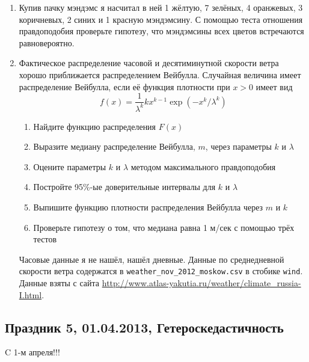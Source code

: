 \documentclass[12pt, a4paper]{article}\usepackage[]{graphicx}\usepackage[]{color}
\begin{document}
\begin{enumerate}
\item Купив пачку мэндэмс я насчитал в ней 1 жёлтую, 7 зелёных, 4 оранжевых, 3 коричневых, 2 синих и 1 красную мэндэмсину. С помощью теста отношения правдоподобия проверьте гипотезу, что мэндэмсины всех цветов встречаются равновероятно.
\item \useR Фактическое распределение часовой и десятиминутной скорости ветра хорошо приближается распределением Вейбулла. Случайная величина имеет распределение Вейбулла, если её функция плотности при $x>0$ имеет вид
\[
f(x)=\frac{1}{\lambda^k}kx^{k-1}\exp(-x^k/\lambda^k)
\]
\begin{enumerate}
\item Найдите функцию распределения $F(x)$
\item Выразите медиану распределение Вейбулла, $m$, через параметры $k$ и $\lambda$
\item Оцените параметры $k$ и $\lambda$ методом максимального правдоподобия
\item Постройте 95\%-ые доверительные интервалы для $k$ и $\lambda$
\item Выпишите функцию плотности распределения Вейбулла через $m$ и $k$
\item Проверьте гипотезу о том, что медиана равна 1 м/сек с помощью трёх тестов
\end{enumerate}
Часовые данные я не нашёл, нашёл дневные. Данные по среднедневной скорости ветра содержатся в \verb|weather_nov_2012_moskow.csv| в стобике \verb|wind|. Данные взяты с сайта \url{http://www.atlas-yakutia.ru/weather/climate_russia-I.html}.

\end{enumerate}

\subsection{Праздник 5, 01.04.2013, Гетероскедастичность}

C 1-м апреля!!!
\end{document}
